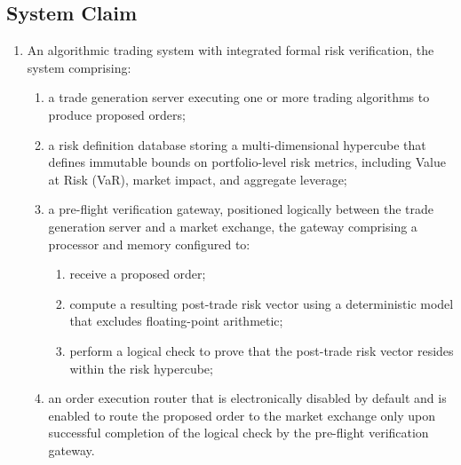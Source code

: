 \documentclass{article}
\begin{document}
\subsection*{System Claim}
\begin{enumerate}
    \item An algorithmic trading system with integrated formal risk verification, the system comprising:
    \begin{enumerate}
        \item a trade generation server executing one or more trading algorithms to produce proposed orders;
        \item a risk definition database storing a multi-dimensional hypercube that defines immutable bounds on portfolio-level risk metrics, including Value at Risk (VaR), market impact, and aggregate leverage;
        \item a pre-flight verification gateway, positioned logically between the trade generation server and a market exchange, the gateway comprising a processor and memory configured to:
        \begin{enumerate}
            \item receive a proposed order;
            \item compute a resulting post-trade risk vector using a deterministic model that excludes floating-point arithmetic;
            \item perform a logical check to prove that the post-trade risk vector resides within the risk hypercube;
        \end{enumerate}
        \item an order execution router that is electronically disabled by default and is enabled to route the proposed order to the market exchange only upon successful completion of the logical check by the pre-flight verification gateway.
    \end{enumerate}
\end{enumerate}
\end{document}

